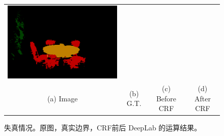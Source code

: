 \begin{figure}[!t]
{\begin{tabular} {c c c c}
    \includegraphics[width=0.24\linewidth]{fig/failure_mode/voc12/resnet101_noup_pool3_coco_22/after_crf/2009_002487.png} \\
                    {\scriptsize (a) Image} &
                    {\scriptsize (b) G.T.} &
                    {\scriptsize (c) Before CRF} &
                    {\scriptsize (d) After CRF} \\
  \end{tabular}

}
  \caption{失真情况。原图，真实边界，CRF前后 DeepLab 的运算结果。}  
  \label{fig:failure_modes}
\end{figure}
